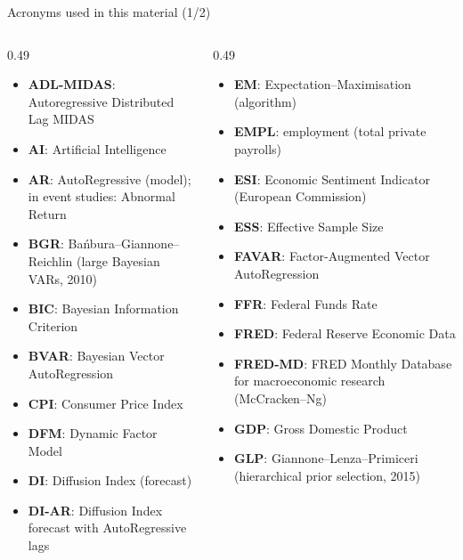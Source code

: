 {
\begin{frame}[noframenumbering]
    \titlepage
\end{frame}
}
\begin{frame}{Acronyms used in this material (1/2)}
\begin{columns}[T]
\begin{column}{0.49\textwidth}
\begin{itemize}\setlength{\itemsep}{0pt}
    \item \textbf{ADL-MIDAS}: Autoregressive Distributed Lag MIDAS
    \item \textbf{AI}: Artificial Intelligence
    \item \textbf{AR}: AutoRegressive (model); in event studies: Abnormal Return
    \item \textbf{BGR}: Bańbura–Giannone–Reichlin (large Bayesian VARs, 2010)
    \item \textbf{BIC}: Bayesian Information Criterion
    \item \textbf{BVAR}: Bayesian Vector AutoRegression
    \item \textbf{CPI}: Consumer Price Index
    \item \textbf{DFM}: Dynamic Factor Model
    \item \textbf{DI}: Diffusion Index (forecast)
    \item \textbf{DI-AR}: Diffusion Index forecast with AutoRegressive lags
\end{itemize}
\end{column}
\begin{column}{0.49\textwidth}
\begin{itemize}\setlength{\itemsep}{0pt}
    \item \textbf{EM}: Expectation–Maximisation (algorithm)
    \item \textbf{EMPL}: employment (total private payrolls)
    \item \textbf{ESI}: Economic Sentiment Indicator (European Commission)
    \item \textbf{ESS}: Effective Sample Size
    \item \textbf{FAVAR}: Factor-Augmented Vector AutoRegression
    \item \textbf{FFR}: Federal Funds Rate
    \item \textbf{FRED}: Federal Reserve Economic Data
    \item \textbf{FRED-MD}: FRED Monthly Database for macroeconomic research (McCracken–Ng)
    \item \textbf{GDP}: Gross Domestic Product
    \item \textbf{GLP}: Giannone–Lenza–Primiceri (hierarchical prior selection, 2015)
\end{itemize}
\end{column}
\end{columns}
\end{frame}
